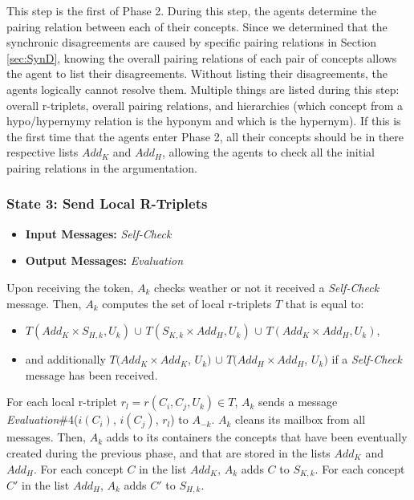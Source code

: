 This step is the first of Phase 2. During this step, the agents determine the pairing relation between each of their concepts. Since we determined that the synchronic disagreements are caused by specific pairing relations in Section \ref{sec:SynD}, knowing the overall pairing relations of each pair of concepts allows the agent to list their disagreements. Without listing their disagreements, the agents logically cannot resolve them. Multiple things are listed during this step: overall r-triplets, overall pairing relations, and hierarchies (which concept from a hypo/hypernymy relation is the hyponym and which is the hypernym). If this is the first time that the agents enter Phase 2, all their concepts should be in there respective lists $Add_{K}$ and $Add_{H}$, allowing the agents to check all the initial pairing relations in the argumentation.

\subsubsection{State 3: Send Local R-Triplets}

\begin{itemize}
    \item \textbf{Input Messages:} \emph{Self-Check}
    \item \textbf{Output Messages:} \emph{Evaluation}
\end{itemize}

Upon receiving the token, $A_{k}$ checks weather or not it received a \emph{Self-Check} message. Then, $A_{k}$ computes the set of local r-triplets $T$ that is equal to:

\begin{itemize}
    \item $T(Add_{K} \times S_{H,k}, U_{k})$ $\cup$ $T(S_{K,k} \times Add_{H}, U_{k})$ $\cup$ $T(Add_{K} \times Add_{H}, U_{k})$,
    \item and additionally $T(Add_{K} \times Add_{K}$, $U_{k})$ $\cup$ $T(Add_{H} \times Add_{H}$, $U_{k})$ if a \emph{Self-Check} message has been received.
\end{itemize}

For each local r-triplet $r_{l} = r(C_{i}, C_{j}, U_{k}) \in T$, $A_{k}$ sends a message \emph{Evaluation}\#4($i(C_{i})$, $i(C_{j})$, $r_{l}$) to $A_{-k}$. $A_{k}$ cleans its mailbox from all messages. Then, $A_{k}$ adds to its containers the concepts that have been eventually created during the previous phase, and that are stored in the lists $Add_{K}$ and $Add_{H}$. For each concept $C$ in the list $Add_{K}$, $A_{k}$ adds $C$ to $S_{K,k}$. For each concept $C'$ in the list $Add_{H}$, $A_{k}$ adds $C'$ to $S_{H,k}$.

